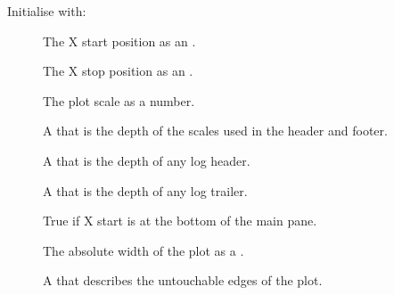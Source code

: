 \documentclass[letterpaper,10pt,english]{sphinxmanual}
\begin{document}
\begin{fulllineitems}
\begin{fulllineitems}
\label{\detokenize{ref/util/plot/Plot:TotalDepth.util.plot.Plot.PlotRoll.__init__}}
Initialise with:
\begin{description}
\item[{}] \leavevmode
The X start position as an .

\item[{}] \leavevmode
The X stop position as an .

\item[{}] \leavevmode
The plot scale as a number.

\item[{}] \leavevmode
A  that is the depth of the scales used in
the header and footer.

\item[{}] \leavevmode
A  that is the depth of any log header.

\item[{}] \leavevmode
A  that is the depth of any log trailer.

\item[{}] \leavevmode
True if X start is at the bottom of the main pane.

\item[{}] \leavevmode
The absolute width of the plot as a .

\item[{}] \leavevmode
A  that describes the untouchable edges of the plot.

\end{description}


\end{fulllineitems}
\end{fulllineitems}
\end{document}
